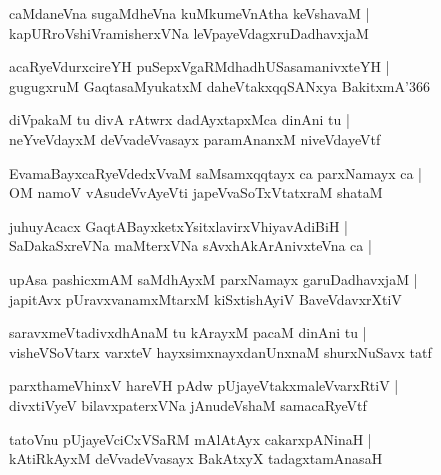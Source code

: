 \documentclass[twoside,12pt,openright]{book}
\newcounter{shloka}[chapter]
\begin{document}
\begin{shloka}%
caMdaneVna sugaMdheVna kuMkumeVnAtha keVshavaM |\\
kapURroVshiVramisherxVNa leVpayeVdagxruDadhavxjaM 
\end{shloka}

\begin{shloka}%
acaRyeVdurxcireYH puSepxVgaRMdhadhUSasamanivxteYH |\\
gugugxruM GaqtasaMyukatxM daheVtakxqqSANxya BakitxmA\char'366 
\end{shloka}

\begin{shloka}%
diVpakaM tu divA rAtwrx dadAyxtapxMca dinAni tu |\\
neYveVdayxM deVvadeVvasayx paramAnanxM niveVdayeVtf 
\end{shloka}

\begin{shloka}%
EvamaBayxcaRyeVdedxVvaM saMsamxqqtayx ca parxNamayx ca |\\
OM namoV vAsudeVvAyeVti japeVvaSoTxVtatxraM shataM 
\end{shloka}

\begin{shloka}%
juhuyAcacx GaqtABayxketxYsitxlavirxVhiyavAdiBiH |\\
SaDakaSxreVNa maMterxVNa sAvxhAkArAnivxteVna ca |
\end{shloka}

\begin{shloka}%
upAsa pashicxmAM saMdhAyxM parxNamayx garuDadhavxjaM |\\
japitAvx pUravxvanamxMtarxM kiSxtishAyiV BaveVdavxrXtiV 
\end{shloka}

\begin{shloka}%
saravxmeVtadivxdhAnaM tu kArayxM pacaM dinAni tu |\\
visheVSoVtarx varxteV hayxsimxnayxdanUnxnaM shurxNuSavx tatf
\end{shloka}

\begin{shloka}%
parxthameVhinxV hareVH pAdw pUjayeVtakxmaleVvarxRtiV |\\
divxtiVyeV bilavxpaterxVNa jAnudeVshaM samacaRyeVtf 
\end{shloka}

\begin{shloka}%
tatoVnu pUjayeVciCxVSaRM mAlAtAyx cakarxpANinaH |\\
kAtiRkAyxM deVvadeVvasayx BakAtxyX tadagxtamAnasaH 
\end{shloka}
\end{document}
